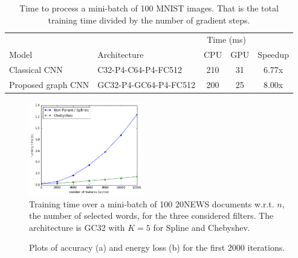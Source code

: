 \documentclass{article}
\begin{document}
\begin{table}[h!] \centering
\begin{tabular}{llccc} \toprule
& & \multicolumn{2}{c}{Time (ms)} & \\
Model & Architecture & CPU & GPU & Speedup \\
\midrule
Classical CNN & C32-P4-C64-P4-FC512 & 210 & 31 & 6.77x \\
Proposed graph CNN & GC32-P4-GC64-P4-FC512 & 200 & 25 & 8.00x \\
\bottomrule \end{tabular}
\caption{Time to process a mini-batch of 100 MNIST images. That is the total
training time divided by the number of gradient steps.} 
\label{tab:speedup}
\end{table}

\begin{figure}[h!]
\centering
\includegraphics[width=5cm]{images/speed.png}
\caption{Training time over a mini-batch of 100 20NEWS documents w.r.t. $n$, the
number of selected words, for the three considered filters. The architecture is
GC32 with $K=5$ for Spline and Chebyshev.}
\label{fig:runtime}
\end{figure}

\begin{figure}[h!]
\centering
{}
\hfill
{}
\caption{Plots of accuracy (a) and energy loss (b) for the first 2000
iterations.}
\label{fig:convergence}
\end{figure}
\end{document}
